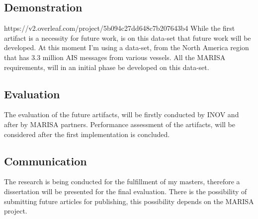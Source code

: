 \subsection{Demonstration}https://v2.overleaf.com/project/5b094c27dd648c7b207643b4
While the first artifact is a necessity for future work, is on this data-set that future work will be developed. At this moment I'm using a data-set, from the North America region that has 3.3 million AIS messages from various vessels.
All the MARISA requirements, will in an initial phase be developed on this data-set.
\subsection{Evaluation}
The evaluation of the future artifacts, will be firstly conducted by INOV and after by MARISA partners.
Performance assessment of the artifacts, will be considered after the first implementation is concluded.

\subsection{Communication} 
The research is being conducted for the fulfillment of my masters, therefore a dissertation will be presented for the final evaluation. There is the possibility of submitting future articles for publishing, this possibility depends on the MARISA project.
